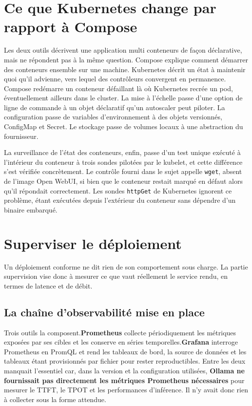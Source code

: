 \documentclass[10pt,a4paper]{article}
\begin{document}
\section{Ce que Kubernetes change par rapport à Compose}

Les deux outils décrivent une application multi conteneurs de façon
déclarative, mais ne répondent pas à la même question. Compose explique comment
démarrer des conteneurs ensemble sur une machine. Kubernetes décrit un état à
maintenir quoi qu'il advienne, vers lequel des contrôleurs convergent en
permanence. Compose redémarre un conteneur défaillant là où Kubernetes recrée
un pod, éventuellement ailleurs dans le cluster. La mise à l'échelle passe
d'une option de ligne de commande à un objet déclaratif qu'un autoscaler peut
piloter. La configuration passe de variables d'environnement à des objets
versionnés, ConfigMap et Secret. Le stockage passe de volumes locaux à une
abstraction du fournisseur.

La surveillance de l'état des conteneurs, enfin, passe d'un test unique exécuté
à l'intérieur du conteneur à trois sondes pilotées par le kubelet, et cette
différence s'est vérifiée concrètement. Le contrôle fourni dans le sujet appelle
\texttt{wget}, absent de l'image Open WebUI, si bien que le conteneur restait
marqué en défaut alors qu'il répondait correctement. Les sondes
\texttt{httpGet} de Kubernetes ignorent ce problème, étant exécutées depuis
l'extérieur du conteneur sans dépendre d'un binaire embarqué.

\section{Superviser le déploiement}

Un déploiement conforme ne dit rien de son comportement sous charge. La partie
supervision vise donc à mesurer ce que vaut réellement le service rendu, en
termes de latence et de débit.

\subsection{La chaîne d'observabilité mise en place}

Trois outils la composent.\textbf{Prometheus} collecte périodiquement les
métriques exposées par ses cibles et les conserve en séries temporelles.\textbf{Grafana} interroge Prometheus en PromQL et rend les tableaux de bord,
la source de données et les tableaux étant provisionnés par fichier pour
rester reproductibles. Entre les deux manquait l'essentiel car, dans la version
et la configuration utilisées, \textbf{Ollama ne fournissait pas directement
les métriques Prometheus nécessaires} pour mesurer le TTFT, le TPOT et les
performances d'inférence. Il n'y avait donc rien à collecter sous la forme
attendue.
\end{document}
